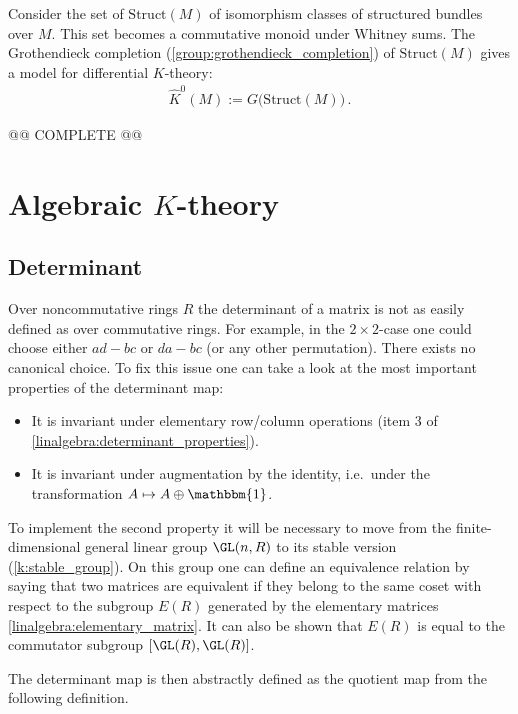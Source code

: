 {{        Consider the set of $\mathrm{Struct}(M)$ of isomorphism classes of structured bundles over $M$. This set becomes a commutative monoid under Whitney sums. The Grothendieck completion (\cref{group:grothendieck_completion}) of $\mathrm{Struct}(M)$ gives a model for differential $K$-theory:
        \begin{gather}
            \widehat{K}^0(M) := G\bigl(\mathrm{Struct}(M)\bigr)\,.
        \end{gather}
    }

    @@ COMPLETE @@

\section{\texorpdfstring{Algebraic $K$-theory}{Algebraic K-theory}}
\subsection{Determinant}

    Over noncommutative rings $R$ the determinant of a matrix is not as easily defined as over commutative rings. For example, in the $2\times2$-case one could choose either $ad-bc$ or $da-bc$ (or any other permutation). There exists no canonical choice. To fix this issue one can take a look at the most important properties of the determinant map:
    \begin{itemize}
        \item It is invariant under elementary row/column operations (item 3 of \cref{linalgebra:determinant_properties}).
        \item It is invariant under augmentation by the identity, i.e.~under the transformation $A\mapsto A\oplus\mathbbm{1}$.
    \end{itemize}
    To implement the second property it will be necessary to move from the finite-dimensional general linear group $\GL(n,R)$ to its stable version (\cref{k:stable_group}). On this group one can define an equivalence relation by saying that two matrices are equivalent if they belong to the same coset with respect to the subgroup $E(R)$ generated by the elementary matrices \ref{linalgebra:elementary_matrix}. It can also be shown that $E(R)$ is equal to the commutator subgroup $[\GL(R),\GL(R)]$.

    The determinant map is then abstractly defined as the quotient map from the following definition.

}
